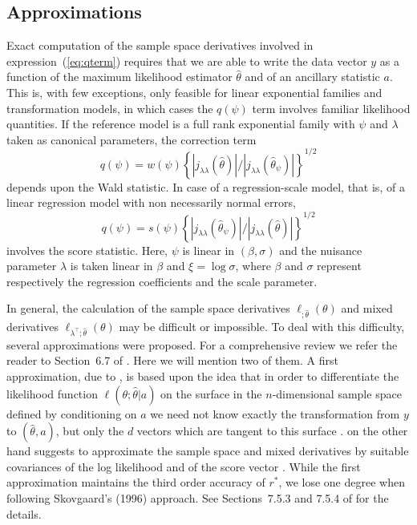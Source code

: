 \documentclass[a4paper,11pt]{article}
\begin{document}
\subsection*{Approximations}
%
Exact computation of the sample space derivatives involved in expression~(\ref{eq:qterm}) requires that we are able to write the data vector $y$ as a function of the maximum likelihood estimator $\hat\theta$ and of an ancillary statistic $a$.  This is, with few exceptions, only feasible for linear exponential families and transformation models, in which cases the $q(\psi)$ term involves familiar likelihood quantities.  If the reference model is a full rank exponential family with $\psi$ and $\lambda$ taken as canonical parameters, the correction term 
%
\begin{equation}
\label{eq:qexp}
q(\psi) = w(\psi) \left\{ 
          |j_{\lambda\lambda}(\hat\theta)|/|j_{\lambda\lambda}(\hat\theta_\psi)| \right\}^{1/2}
\end{equation}
%
depends upon the Wald statistic.  In case of a regression-scale model, that is, of a linear regression model with non necessarily normal errors,
%
\begin{equation}
\label{eq:qreg}
q(\psi) = s(\psi)  
          \left\{ |j_{\lambda\lambda}(\hat\theta_\psi)|/|j_{\lambda\lambda}(\hat\theta)| \right\}^{1/2}
\end{equation} 
%
involves the score statistic.  Here, $\psi$ is linear in $(\beta,\sigma)$ and the nuisance parameter $\lambda$ is taken linear in $\beta$ and $\xi = \log\sigma$, where $\beta$ and $\sigma$ represent respectively the regression coefficients and the scale parameter.

In general, the calculation of the sample space derivatives $\ell_{;\hat\theta}(\theta)$ and mixed derivatives $\ell_{\lambda^\top;\hat\theta}(\theta)$ may be difficult or impossible.  To deal with this difficulty, several approximations were proposed.  For a comprehensive review we refer the reader to Section~6.7 of \citet{severini:2000}.  Here we will mention two of them.  A first approximation, due to \citet{fraser.reid.wu:1999}, is based upon the idea that in order to differentiate the likelihood function $\ell(\theta;\hat\theta|a)$ on the surface in the $n$-dimensional sample space defined by conditioning on $a$ we need not know exactly the transformation from $y$ to $(\hat\theta,a)$, but only the $d$ vectors which are tangent to this surface \citep[Section~6.7.2]{severini:2000}.  \citet{skovgaard:1996} on the other hand suggests to approximate the sample space and mixed derivatives by suitable covariances of the log likelihood and of the score vector \citep[Section~6.7.3]{severini:2000}.  While the first approximation maintains the third order accuracy of $r^*$, we lose one degree when following Skovgaard's (1996) approach.  See Sections~7.5.3 and 7.5.4 of \citet{severini:2000} for the details.  
\end{document}

